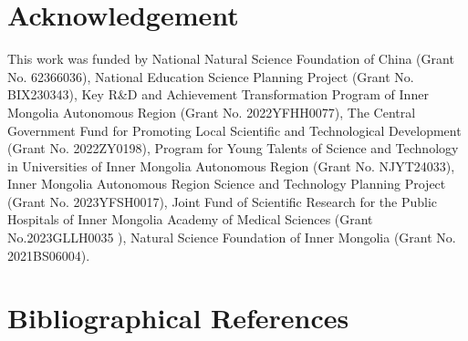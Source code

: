 \documentclass[10pt, a4paper]{article}
\begin{document}
\section{Acknowledgement}

This work was funded by National Natural Science Foundation of China (Grant No. 62366036), National Education Science Planning Project (Grant No. BIX230343), Key R\&D and Achievement Transformation Program of Inner Mongolia Autonomous Region (Grant No. 2022YFHH0077), The Central Government Fund for Promoting Local Scientific and Technological Development (Grant No. 2022ZY0198), Program for Young Talents of Science and Technology in Universities of Inner Mongolia Autonomous Region (Grant No. NJYT24033), Inner Mongolia Autonomous Region Science and Technology Planning Project (Grant No. 2023YFSH0017), Joint Fund of Scientific Research for the Public Hospitals of Inner Mongolia Academy of Medical Sciences (Grant No.2023GLLH0035 ), Natural Science Foundation of Inner Mongolia (Grant No. 2021BS06004).



\section{Bibliographical References}\label{sec:reference}



\end{document}
